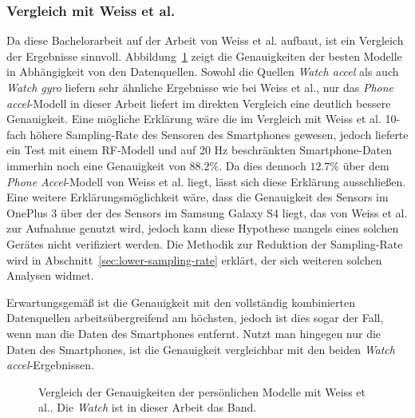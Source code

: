 \subsubsection{Vergleich mit Weiss et al.}
Da diese Bachelorarbeit auf der Arbeit von Weiss et al. \cite{Weiss2016} aufbaut, ist ein Vergleich der Ergebnisse sinnvoll. Abbildung~\ref{fig:accuracy-personal-vs-weiss} zeigt die Genauigkeiten der besten Modelle in Abhängigkeit von den Datenquellen. Sowohl die Quellen \textit{Watch accel} als auch \textit{Watch gyro} liefern sehr ähnliche Ergebnisse wie bei Weiss et al., nur das \textit{Phone accel}-Modell in dieser Arbeit liefert im direkten Vergleich eine deutlich bessere Genauigkeit. Eine mögliche Erklärung wäre die im Vergleich mit Weiss et al. 10-fach höhere Sampling-Rate des Sensoren des Smartphones gewesen, jedoch lieferte ein Test mit einem RF-Modell und auf 20 Hz beschränkten Smartphone-Daten immerhin noch eine Genauigkeit von $88.2 \%$. Da dies dennoch $12.7 \%$ über dem \textit{Phone Accel}-Modell von Weiss et al. liegt, lässt sich diese Erklärung ausschließen. Eine weitere Erklärungsmöglichkeit wäre, dass die Genauigkeit des Sensors im OnePlus 3 über der des Sensors im Samsung Galaxy S4 liegt, das von Weiss et al. zur Aufnahme genutzt wird, jedoch kann diese Hypothese mangels eines solchen Gerätes nicht verifiziert werden. Die Methodik zur Reduktion der Sampling-Rate wird in Abschnitt~\ref{sec:lower-sampling-rate} erklärt, der sich weiteren solchen Analysen widmet.

Erwartungsgemäß ist die Genauigkeit mit den vollständig kombinierten Datenquellen arbeitsübergreifend am höchsten, jedoch ist dies sogar der Fall, wenn man die Daten des Smartphones entfernt. Nutzt man hingegen nur die Daten des Smartphones, ist die Genauigkeit vergleichbar mit den beiden \textit{Watch accel}-Ergebnissen.

\begin{figure}
\centering
{}
\caption[Vergleich der Genauigkeiten der persönlichen Modelle mit Weiss et al.\cite{Weiss2016}]{Vergleich der Genauigkeiten der persönlichen Modelle mit Weiss et al.\cite{Weiss2016}. Die \textit{Watch} ist in dieser Arbeit das Band.}
\label{fig:accuracy-personal-vs-weiss}
\end{figure}

